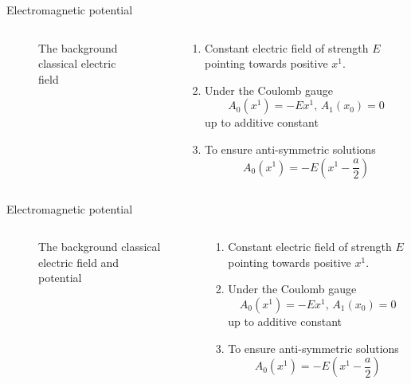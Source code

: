 \begin{frame}{Electromagnetic potential}
	\begin{columns}
	    \begin{column}{0.5\textwidth}
\begin{figure}[ht]
    \centering
    \caption{The background classical electric field}
    \label{fig:the-background-classical-electric-field}
\end{figure}
	    \end{column}
	    \begin{column}{0.5\textwidth}
		    \begin{enumerate}[<+->]
		    	\item 
	    Constant electric field of strength $E$ pointing towards positive $x^{1}.$
    \item Under the Coulomb gauge $$A_0(x^{1}) = -Ex^{1},\, A_1(x_0) = 0$$ up to additive constant
    \item To ensure anti-symmetric solutions $$A_0(x^{1})=-E(x^{1}-\frac{a}{2})$$

		    \end{enumerate}
	    \end{column}
	\end{columns}

\end{frame}
\begin{frame}{Electromagnetic potential}
	\begin{columns}
	    \begin{column}{0.5\textwidth}
\begin{figure}[ht]
    \centering
    \caption{The background classical electric field and potential}
    \label{fig:the-background-classical-electric-field-and-potential}
\end{figure}
	    \end{column}
	    \begin{column}{0.5\textwidth}
		    \begin{enumerate}
		    	\item 
	    Constant electric field of strength $E$ pointing towards positive $x^{1}.$
    \item Under the Coulomb gauge $$A_0(x^{1}) = -Ex^{1},\, A_1(x_0) = 0$$ up to additive constant
    \item To ensure anti-symmetric solutions $$A_0(x^{1})=-E(x^{1}-\frac{a}{2})$$

		    \end{enumerate}
	    \end{column}
	\end{columns}
\end{frame}

